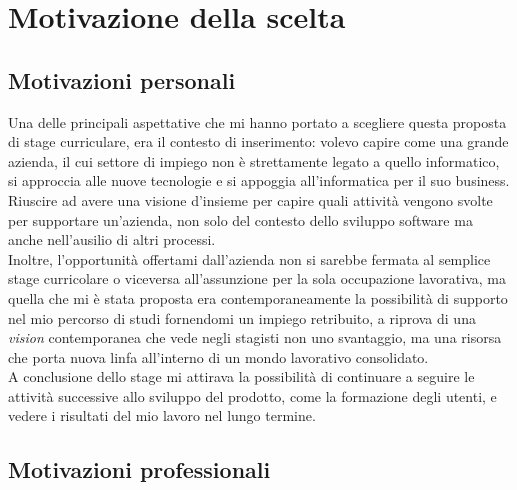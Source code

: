 \section{Motivazione della scelta}

\subsection{Motivazioni personali}

Una delle principali aspettative che mi hanno portato a scegliere questa proposta di stage curriculare, era il contesto di inserimento: volevo capire come una grande azienda, il cui settore di impiego non è strettamente legato a quello informatico, si approccia alle nuove tecnologie e si appoggia all'informatica per il suo business. 
\\
Riuscire ad avere una visione d'insieme per capire quali attività vengono svolte per supportare un'azienda, non solo del contesto dello sviluppo software ma anche nell'ausilio di altri processi.
\\
Inoltre, l'opportunità offertami dall'azienda non si sarebbe fermata al semplice stage curricolare o viceversa all'assunzione per la sola occupazione lavorativa, ma quella che mi è stata proposta era contemporaneamente la possibilità di supporto nel mio percorso di studi fornendomi un impiego retribuito, a riprova di una \textit{vision} contemporanea che vede negli stagisti non uno svantaggio, ma una risorsa che porta nuova linfa all'interno di un mondo lavorativo consolidato.
\\
A conclusione dello stage mi attirava la possibilità di continuare a seguire le attività successive allo sviluppo del prodotto, come la formazione degli utenti, e vedere i risultati del mio lavoro nel lungo termine.

\subsection{Motivazioni professionali}

